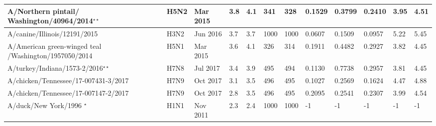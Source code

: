 \begin{tabular}{L{1.32in}|L{.35in}|L{.3in}|L{.3in}|L{.3in}|L{.35in}|L{.35in}|L{.35in}|L{.35in}|L{.32in}|L{.3in}|L{.3in}}
 A/Northern  pintail/ Washington/40964/2014$^{\star\star}$ &H5N2& Mar  2015 &3.8&4.1&341&328&0.1529&0.3799&0.2410&3.95&4.51\\\hline
 A/canine/Illinois/12191/2015 &H3N2& Jun  2016 &3.7&3.7&1000&1000&0.0607&0.1509&0.0957&5.22&5.45\\\hline
 A/American  green-winged  teal /Washington/1957050/2014 &H5N1& Mar 2015 &3.6&4.1&326&314&0.1911&0.4482&0.2927&3.82&4.45\\\hline
 A/turkey/Indiana/1573-2/2016$^{\star\star}$ &H7N8& Jul  2017 &3.4&3.9&495&494&0.1130&0.7738&0.2957&3.81&4.45\\\hline
 A/chicken/Tennessee/17-007431-3/2017 &H7N9& Oct  2017 &3.1&3.5&496&495&0.1027&0.2569&0.1624&4.47&4.88\\\hline
 A/chicken/Tennessee/17-007147-2/2017 &H7N9& Oct  2017 &2.8&3.5&496&495&0.2095&0.2541&0.2307&3.99&4.54\\\hline
 A/duck/New  York/1996 $^\star$&H1N1& Nov  2011 &2.3&2.4&1000&1000&-1&-1&-1&-1&-1\\\hline
 \end{tabular}